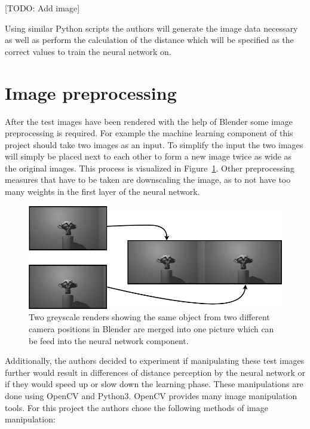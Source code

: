 [TODO: Add image]

Using similar Python scripts the authors will generate the image data necessary as well as perform the calculation of the distance which will be specified as the correct values to train the neural network on.

\section{Image preprocessing}
After the test images have been rendered with the help of Blender some image preprocessing is required. For example the machine learning component of this project should take two images as an input. To simplify the input the two images will simply be placed next to each other to form a new image twice as wide as the original images. This process is visualized in Figure~\ref{pic:methodology_imagePreprocessing_imageMerge}. Other preprocessing measures that have to be taken are downscaling the image, as to not have too many weights in the first layer of the neural network.

\begin{figure}[h!]
	\centering
	\includegraphics[width=6.5in]{img/methodology_imagePreprocessing_imageMerge.png}
	\caption{Two greyscale renders showing the same object from two different camera positions in Blender are merged into one picture which can be feed into the neural network component.}
	\label{pic:methodology_imagePreprocessing_imageMerge}
\end{figure}

Additionally, the authors decided to experiment if manipulating these test images further would result in differences of distance perception by the neural network or if they would speed up or slow down the learning phase. These manipulations are done using OpenCV and Python3. OpenCV provides many image manipulation tools. For this project the authors chose the following methods of image manipulation:

